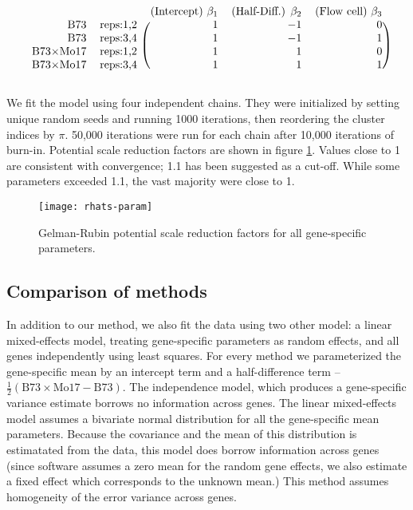 \begin{equation*}
\begin{blockarray}{rlrrr}
  && \mbox{(Intercept) }\beta_1 & \mbox{(Half-Diff.) }\beta_2 & \mbox{(Flow cell) }\beta_3\\
  \begin{block}{rl(rrr)}
  \mbox{B73}            &\mbox{reps:1,2} & 1 & -1 & 0\\
  \mbox{B73}            &\mbox{reps:3,4} & 1 & -1 & 1\\
  \mbox{B73$\times$Mo17}&\mbox{reps:1,2} & 1 & 1 & 0\\
  \mbox{B73$\times$Mo17}&\mbox{reps:3,4} & 1 & 1 & 1\\
  \end{block}
\end{blockarray}
\label{design}
\end{equation*}

We fit the model using four independent chains. They were initialized by setting unique random seeds and running 1000 iterations, then reordering the cluster indices by $\pi$. 50,000 iterations were run for each chain after 10,000 iterations of burn-in. Potential scale reduction factors are shown in figure \ref{rhat}. Values close to 1 are consistent with convergence; 1.1 has been suggested as a cut-off. While some parameters exceeded 1.1, the vast majority were close to 1.

\begin{figure}
\centering
\texttt{[image: rhats-param]}
\caption{Gelman-Rubin potential scale reduction factors for all gene-specific parameters.}
\label{rhat}
\end{figure}

\subsection{Comparison of methods}
In addition to our method, we also fit the data using two other model: a linear mixed-effects model, treating gene-specific parameters as random effects, and all genes independently using least squares. For every method we parameterized the gene-specific mean by an intercept term and a half-difference term -- $\frac{1}{2}(\mbox{B73}\times\mbox{Mo17}-\mbox{B73})$. The independence model, which produces a gene-specific variance estimate borrows no information across genes. The linear mixed-effects model assumes a bivariate normal distribution for all the gene-specific mean parameters. Because the covariance and the mean of this distribution is estimatated from the data, this model does borrow information across genes (since software assumes a zero mean for the random gene effects, we also estimate a fixed effect which corresponds to the unknown mean.) This method assumes homogeneity of the error variance across genes.

